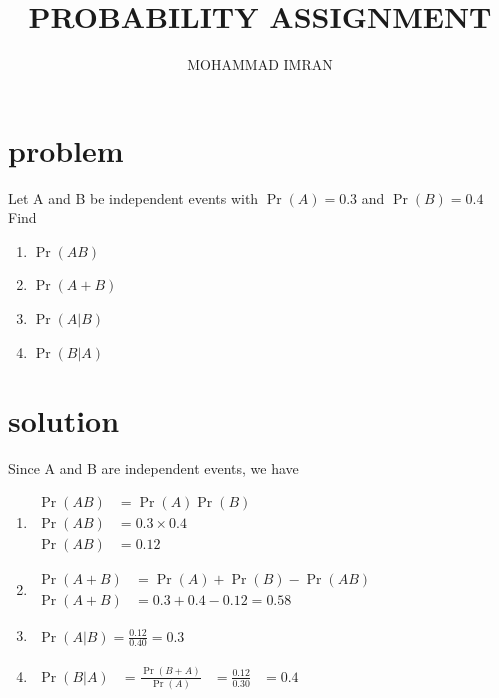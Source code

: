 \documentclass[journal,12pt,twocolumn]{article}
\title{PROBABILITY ASSIGNMENT}
\author{MOHAMMAD IMRAN}
\providecommand{\pr}[1]{\ensuremath{\Pr\left(#1\right)}}
\begin{document}
\maketitle
\bigskip

\section{problem }

Let A and B be independent events with $\pr{A}=0.3$ and $\pr{B}=0.4$ Find 
\begin{enumerate}

\item$\pr{AB}$
\item$\pr{A+B}$ 
\item$\pr{A | B}$   
\item$\pr{B | A}$
       \end{enumerate}
\section{solution }  


Since A and B are independent events, we have 

\begin{enumerate}

\item $\begin{aligned}
 \pr{AB}&=\pr{A} \pr{B}&\\
\pr{AB}&=0.3 \times 0.4&\\
\pr{AB}&=0.12&
\end{aligned}$


\item $\begin{aligned}
\pr{A+B}&=\pr{A}+\pr{B}-\pr{AB}&\\
\pr{A+B}&=0.3+0.4-0.12=0.58&
\end{aligned}$


\item $\begin{aligned}
\pr{A|B}=\frac{0.12}{0.40}=0.3
\end{aligned}$
\item $\begin{aligned}
\pr{B|A}&=\frac{\pr{B+A}}{\pr{A}}&=\frac{0.12}{0.30}&=0.4&
\end{aligned}$
\end{enumerate}
\end{document}
